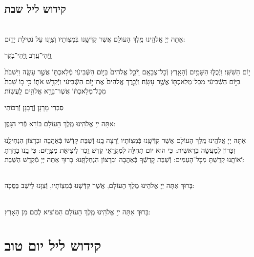 \documentclass[twoside, openany, parskip=half, 11pt]{book}
\begin{document}
\section*{ קידוש ליל שבת }

\\
אַתָּה יְיָ אֱלֹהֵֽינוּ מֶֽלֶךְ הָעוֹלָם אֲשֶׁר קִדְּֿשָֽׁנוּ בְּֿמִצְוֹתָיו וְֿצִוָּֽנוּ עַל נְֿטִילַת יָדָֽיִם:


\begin{small}וַֽיְֿהִי־עֶ֥רֶב וַֽיְֿהִי־בֹ֖קֶר\end{small}
י֥וֹם הַשִּׁשִּֽׁי׃ וַיְֿכֻלּ֛וּ הַשָּׁמַ֥יִם וְֿהָאָ֖רֶץ וְֿכׇל־צְבָאָֽם׃ וַיְֿכַ֤ל אֱלֹהִים֙ בַּיּ֣וֹם הַשְּֿׁבִיעִ֔י מְֿלַאכְתּ֖וֹ אֲשֶׁ֣ר עָשָׂ֑ה וַיִּשְׁבֹּת֙ בַּיּ֣וֹם הַשְּֿׁבִיעִ֔י מִכׇּל־מְלַאכְתּ֖וֹ אֲשֶׁ֥ר עָשָֽׂה׃ וַיְֿבָ֤רֶךְ אֱלֹהִים֙ אֶת־י֣וֹם הַשְּֿׁבִיעִ֔י וַיְֿקַדֵּ֖שׁ אֹת֑וֹ כִּ֣י ב֤וֹ שָׁבַת֙ מִכׇּל־מְלַאכְתּ֔וֹ אֲשֶׁר־בָּרָ֥א אֱלֹהִ֖ים לַֽעֲשֽׂוֹת׃

\begin{footnotesize}
סַבְרִי מָרָנָן וְֿרֲבָּנָן וְֿרַבּוֹתַי\\
\end{footnotesize}
אַתָּה יְיָ אֱלֹהֵֽינוּ מֶֽלֶךְ הָעוֹלָם בּוֹרֵא פְּֿרִי הַגָּֽפֶן:

אַתָּה יְיָ אֱלֹהֵֽינוּ מֶֽלֶךְ הָעוֹלָם אֲשֶׁר קִדְּֿשָֽׁנוּ בְּֿמִצְוֹתָיו וְֿרָֽצָה בָֽנוּ וְֿשַׁבַּת קָדְֿשׁוֹ בְּֿאַהֲבָה וּבְרָצוֹן הִנְחִילָֽנוּ זִכָּרוֹן לְֿמַעֲשֵׂה בְֿרֵאשִׁית: כִּי הוּא יוֹם תְּֿחִלָּה לְֿמִקְרָאֵי קֹֽדֶשׁ זֵֽכֶר לִיצִיאַת מִצְרָֽיִם: כִּי בָֽנוּ בָחַֽרְתָּ וְֿאוֹתָֽנוּ קִדַּֽשְׁתָּ מִכׇּל־הָעַמִּים: וְֿשַׁבַּת קׇדְשְֿׁךָ בְּֿאַהֲבָה וּבְרָצוֹן הִנְחַלְתָּֽנוּ: בָּרוּךְ אַתָּה יְיָ מְֿקַדֵּשׁ הַשַּׁבָּת:

\begin{sometimes}

\\
בָּרוּךְ אַתָּה יְיָ אֱלֹהֵינוּ מֶלֶךְ הָעוֹלָם, אֲשֶׁר קִדְּֿשָׁנוּ בְּֿמִצְוֹתָיו, וְֿצִוָּנוּ לֵישֵׁב בַּסֻּכָּה:

\end{sometimes}

\\
בָּרוּךְ אַתָּה יְיָ אֱלֹהֵֽינוּ מֶֽלֶךְ הָעוֹלָם הַמּוֹצִיא לֶחֶם מִן הָאָרֶץ:

\chapter[קידוש ליל יום טוב]{ קידוש ליל יום טוב }
\label{kiddush leil yom tov}
\end{document}
